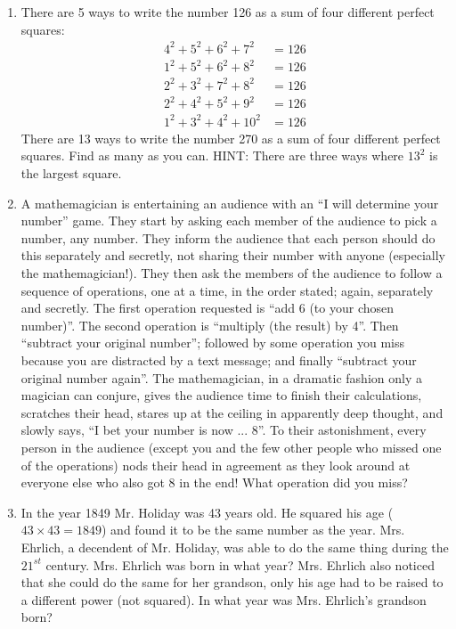 \begin{enumerate}
	\item There are 5 ways to write the number 126 as a sum of four different perfect squares:
	\begin{align*}
		4^{2}+5^{2}+6^{2}+7^{2} & =126\\
		1^{2}+5^{2}+6^{2}+8^{2} & =126\\
		2^{2}+3^{2}+7^{2}+8^{2} & =126\\
		2^{2}+4^{2}+5^{2}+9^{2} & =126\\
		1^{2}+3^{2}+4^{2}+10^{2} & =126
	\end{align*}
	There are 13 ways to write the number 270 as a sum of four different perfect squares. Find as many as you can. HINT: There are three ways where $13^2$ is the largest square.
	
	\item A mathemagician is entertaining an audience with an ``I will determine your number'' game. They start by asking each member of the audience to pick a number, any number. They inform the audience that each person should do this separately and secretly, not sharing their number with anyone (especially the mathemagician!). They then ask the members of the audience to follow a sequence of operations, one at a time, in the order stated; again, separately and secretly. The first operation requested is ``add 6 (to your chosen number)''. The second operation is ``multiply (the result) by 4''. Then ``subtract your original number''; followed by some operation you miss because you are distracted by a text message; and finally ``subtract your original number again''. The mathemagician, in a dramatic fashion only a magician can conjure, gives the audience time to finish their calculations, scratches their head, stares up at the ceiling in apparently deep thought, and slowly says, ``I bet your number is now ... 8''. To their astonishment, every person in the audience (except you and the few other people who missed one of the operations) nods their head in agreement as they look around at everyone else who also got 8 in the end! What operation did you miss?

	\item In the year 1849 Mr. Holiday was 43 years old. He squared his age ($43\times43=1849$) and found it to be the same number as the year. Mrs. Ehrlich, a decendent of Mr. Holiday, was able to do the same thing during the $21^{st}$ century. Mrs. Ehrlich was born in what year? Mrs. Ehrlich also noticed that she could do the same for her grandson, only his age had to be raised to a different power (not squared). In what year was Mrs. Ehrlich's grandson born?
	

\end{enumerate}
